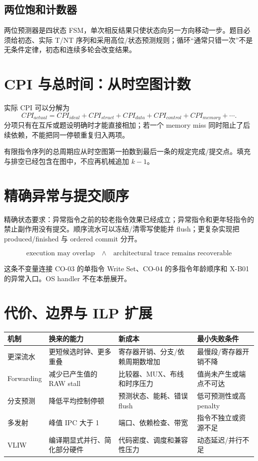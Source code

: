 \documentclass[UTF8,fontset=fandol,11pt,a4paper]{ctexart}
\begin{document}
\subsection{两位饱和计数器}
两位预测器是四状态 FSM，单次相反结果只使状态向另一方向移动一步。题目必须给初态、实际 T/NT 序列和采用高位/状态预测规则；循环“通常只错一次”不是无条件定律，初态和连续多轮会改变结果。

\section{CPI 与总时间：从时空图计数}

实际 CPI 可以分解为
\[
CPI_{actual}=CPI_{ideal}
+CPI_{struct}+CPI_{data}+CPI_{control}+CPI_{memory}+\cdots.
\]
分项只有在互斥或题设明确时才能直接相加；若一个 memory miss 同时阻止了后续依赖，不能把同一停顿重复归入两项。

有限指令序列的总周期应从时空图第一拍数到最后一条的规定完成/提交点。填充与排空已经包含在图中，不应再机械追加 $k-1$。

\section{精确异常与提交顺序}

精确状态要求：异常指令之前的较老指令效果已经成立；异常指令和更年轻指令的禁止副作用没有提交。顺序流水可以冻结/清零写使能并 flush；更复杂实现把 produced/finished 与 ordered commit 分开。

\[
\boxed{\text{execution may overlap}\quad\land\quad
\text{architectural trace remains recoverable}}
\]

这条不变量连接 CO-03 的单指令 Write Set、CO-04 的多指令年龄顺序和 X-B01 的异常入口。OS handler 不在本册展开。

\section{代价、边界与 ILP 扩展}

\begin{center}
\small
\begin{tabularx}{\linewidth}{L{2.2cm}Y Y Y}
\toprule
机制 & 换来的能力 & 新成本 & 最小失败条件\\
\midrule
更深流水 & 更短候选时钟、更多重叠 & 寄存器开销、分支/依赖周期数增加 & 最慢段/寄存器开销不降\\
Forwarding & 减少已产生值的 RAW stall & 比较器、MUX、布线和时序压力 & 值尚未产生或端点不可达\\
分支预测 & 降低平均控制停顿 & 预测状态、能耗、错误 flush & 低可预测性或高 penalty\\
多发射 & 峰值 IPC 大于 1 & 端口、依赖检查、带宽 & 指令不独立或资源不足\\
VLIW & 编译期显式并行、简化部分硬件 & 代码密度、调度和兼容性压力 & 动态延迟/并行不足\\
\bottomrule
\end{tabularx}
\end{center}
\end{document}
